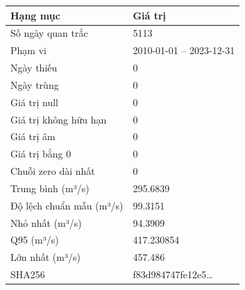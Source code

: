 \begin{tabular}{@{}ll@{}}
\toprule
Hạng mục & Giá trị \\
\midrule
Số ngày quan trắc & 5113 \\
Phạm vi & 2010-01-01 -- 2023-12-31 \\
Ngày thiếu & 0 \\
Ngày trùng & 0 \\
Giá trị null & 0 \\
Giá trị không hữu hạn & 0 \\
Giá trị âm & 0 \\
Giá trị bằng 0 & 0 \\
Chuỗi zero dài nhất & 0 \\
Trung bình (m³/s) & 295.6839 \\
Độ lệch chuẩn mẫu (m³/s) & 99.3151 \\
Nhỏ nhất (m³/s) & 94.3909 \\
Q95 (m³/s) & 417.230854 \\
Lớn nhất (m³/s) & 457.486 \\
SHA256 & f83d984747fe12e5\ldots{} \\
\bottomrule
\end{tabular}
